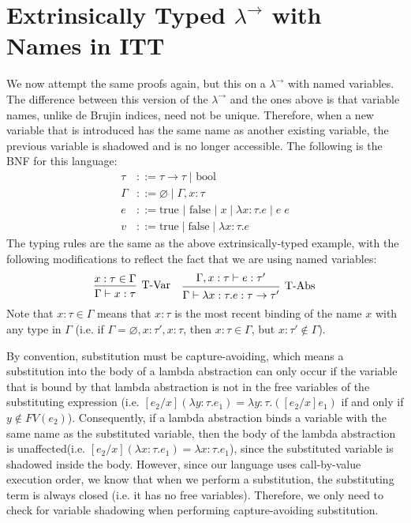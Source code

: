 \documentclass[12pt, letterpaper]{article}
\begin{document}
\section{Extrinsically Typed $\lambda^{\to}$ with Names in ITT}
\begin{flushleft}
We now attempt the same proofs again, but this on a $\lambda^{\to}$ with named variables. The difference between this version of the $\lambda^{\to}$ and the ones above is that variable names, unlike de Brujin indices, need not be unique. Therefore, when a new variable that is introduced has the same name as another existing variable, the previous variable is shadowed and is no longer accessible. The following is the BNF for this language:
\begin{align*}
\tau &::= \tau \to \tau\;|\text{ bool}\\
\Gamma &::= \varnothing\;|\;\Gamma, x :\tau\;\\
e &::= \text{true } | \text{ false } | \; x \;| \;\lambda x:\tau.e \; | \; e
\;e\\
v &::= \text{true}\;|\;\text{false}\;|\;\lambda x : \tau . e
\end{align*}
The typing rules are the same as the above extrinsically-typed example, with the following modifications to reflect the fact that we are using named variables:
\[
\begin{prooftree}
\hypo{x:\tau \in \Gamma}
\infer1[T-Var]{\Gamma \vdash x : \tau}
\end{prooftree}
\;\;\;\;
\begin{prooftree}
\hypo{\Gamma, x : \tau \vdash e : \tau'}
\infer1[T-Abs]{\Gamma \vdash \lambda x : \tau . e : \tau \to \tau'}
\end{prooftree}
\]
Note that $x:\tau \in \Gamma$ means that $x:\tau$ is the most recent binding of the name $x$ with any type in $\Gamma$ (i.e. if $\Gamma = \varnothing, x:\tau', x:\tau$, then $x:\tau \in \Gamma$, but $x:\tau' \not\in \Gamma$).

By convention, substitution must be capture-avoiding, which means a substitution into the body of a lambda abstraction can only occur if the variable that is bound by that lambda abstraction is not in the free variables of the substituting expression (i.e. $[e_2/x](\lambda y : \tau . e_1) = \lambda y : \tau.([e_2/x]e_1)$ if and only if $y \not\in FV(e_2)$). Consequently, if a lambda abstraction binds a variable with the same name as the substituted variable, then the body of the lambda abstraction is unaffected(i.e. $[e_2/x](\lambda x : \tau . e_1) = \lambda x : \tau . e_1$), since the substituted variable is shadowed inside the body. However, since our language uses call-by-value execution order, we know that when we perform a substitution, the substituting term is always closed (i.e. it has no free variables). Therefore, we only need to check for variable shadowing when performing capture-avoiding substitution.


\end{flushleft}
\end{document}
